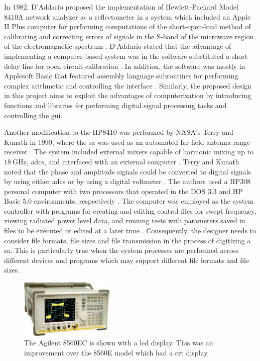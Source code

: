 \documentclass[class=report,11pt,crop=false]{standalone}
\begin{document}
In 1982, D'Addario proposed the implementation of Hewlett-Packard Model 8410A network analyzer as a reflectometer in a system which included an Apple II Plus computer for performing computations of the short-open-load method of calibrating and correcting errors of signals in the S-band of the microwave region of the electromagnetic spectrum \cite{d1982computer}. D'Addario stated that the advantage of implementing a computer-based system was in the software substituted a short delay line for open circuit calibration \cite{d1982computer}. In addition, the software was mostly in Applesoft Basic that featured assembly language subroutines for performing complex arithmetic and controlling the interface \cite{d1982computer}. Similarly, the proposed design in this project aims to exploit the advantages of computerization by introducing functions and libraries for performing digital signal processing tasks and controlling the \acrfull{gui}. 

Another modification to the HP8410 was performed by NASA's Terry and Kunath in 1990, where the \acrshort{sa} was used as an automated far-field antenna range receiver \cite{terry1990}. The system included external mixers capable of harmonic mixing up to $\SI{18}{\giga\hertz}$, \acrfull{adc}s, and interfaced with an external computer \cite{terry1990}. Terry and Kunath noted that the phase and amplitude signals could be converted to digital signals by using either \acrshort{adc}s or by using a digital voltmeter \cite{terry1990}. The authors used a HP308 personal computer with two processors that operated in the DOS 3.3 and HP Basic 5.0 environments, respectively \cite{terry1990}. The computer was employed as the system controller with programs for creating and editing control files for swept frequency, viewing radiated power level data, and running tests with parameters saved in files to be executed or edited at a later time \cite{terry1990}. Consequently, the designer needs to consider file formats, file sizes and file transmission in the process of digitizing a \acrshort{sa}. This is particularly true when the system processes are performed across different devices and programs which may support different file formats and file sizes. 
 
\begin{figure}
	\centering
	\includegraphics[width=0.40\textwidth]{Figures/Literature_Review/agilent-hp8566EC}
	\caption{The Agilent 8560EC is shown with a \acrshort{lcd} display. This was an improvement over the 8560E model which had a \acrshort{crt} display.}
	\label{fig:agilent-hp8560e}
\end{figure} 
\end{document}
